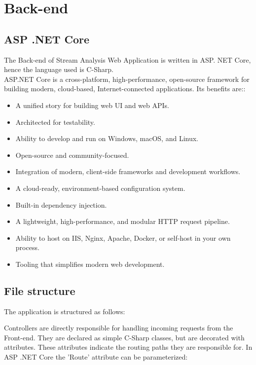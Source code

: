 \section{Back-end}
\label{chap:04:02}

\subsection{ASP .NET Core}
\label{chap:04:02:01}

The Back-end of Stream Analysis Web Application is written in ASP. NET Core, hence the language used is C-Sharp.\\

ASP.NET Core is a cross-platform, high-performance, open-source framework for building modern, cloud-based, Internet-connected applications. Its benefits are:\cite{asp-dotnet-core-description}:
\begin{itemize}
	\item A unified story for building web UI and web APIs.
	\item Architected for testability.
	\item Ability to develop and run on Windows, macOS, and Linux.
	\item Open-source and community-focused.
	\item Integration of modern, client-side frameworks and development workflows.
	\item A cloud-ready, environment-based configuration system.
	\item Built-in dependency injection.
	\item A lightweight, high-performance, and modular HTTP request pipeline.
	\item Ability to host on IIS, Nginx, Apache, Docker, or self-host in your own process.
	\item Tooling that simplifies modern web development.
\end{itemize}

\subsection{File structure}
\label{chap:04:02:02}

The application is structured as follows:


Controllers are directly responsible for handling incoming requests from the Front-end. They are declared as simple C-Sharp classes, but are decorated with attributes. These attributes indicate the routing paths they are responsible for. In ASP .NET Core the 'Route' attribute can be parameterized:

